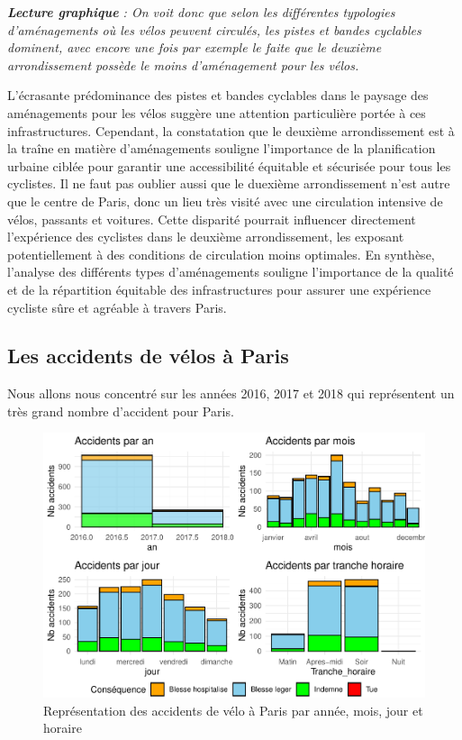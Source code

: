 \documentclass[french,]{compterendu}
\theoremstyle{urcastyle}
\theoremstyle{remark}
\begin{document}
\emph{\textbf{Lecture graphique} : On voit donc que selon les différentes typologies d'aménagements où les vélos peuvent circulés, les pistes et bandes cyclables dominent, avec encore une fois par exemple le faite que le deuxième arrondissement possède le moins d'aménagement pour les vélos.}

L'écrasante prédominance des pistes et bandes cyclables dans le paysage des aménagements pour les vélos suggère une attention particulière portée à ces infrastructures. Cependant, la constatation que le deuxième arrondissement est à la traîne en matière d'aménagements souligne l'importance de la planification urbaine ciblée pour garantir une accessibilité équitable et sécurisée pour tous les cyclistes. Il ne faut pas oublier aussi que le duexième arrondissement n'est autre que le centre de Paris, donc un lieu très visité avec une circulation intensive de vélos, passants et voitures.
Cette disparité pourrait influencer directement l'expérience des cyclistes dans le deuxième arrondissement, les exposant potentiellement à des conditions de circulation moins optimales.
En synthèse, l'analyse des différents types d'aménagements souligne l'importance de la qualité et de la répartition équitable des infrastructures pour assurer une expérience cycliste sûre et agréable à travers Paris.

\hypertarget{les-accidents-de-vuxe9los-uxe0-paris}{%
\subsection{Les accidents de vélos à Paris}\label{les-accidents-de-vuxe9los-uxe0-paris}}

Nous allons nous concentré sur les années 2016, 2017 et 2018 qui représentent un très grand nombre d'accident pour Paris.

\begin{figure}[H]

{\centering \includegraphics[width=0.9\linewidth]{Rapport_ADD_LEO-GABET_files/figure-latex/accParisdetail-1} 

}

\caption{Représentation des accidents de vélo à Paris par année, mois, jour et horaire}\label{fig:accParisdetail}
\end{figure}
\end{document}
